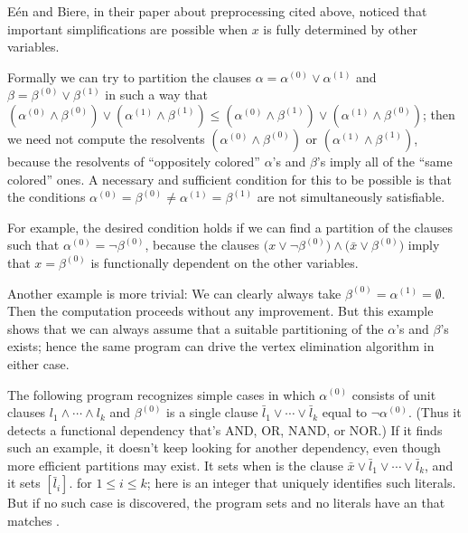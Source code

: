 E\'en and Biere, in their paper about preprocessing cited
above,
noticed that important simplifications are possible when $x$ is fully
determined by other variables.

Formally we can try to partition the
clauses $\alpha=\alpha^{(0)}\lor\alpha^{(1)}$ and
$\beta=\beta^{(0)}\lor\beta^{(1)}$ in such a way that
$(\alpha^{(0)}\land\beta^{(0)})\lor
(\alpha^{(1)}\land\beta^{(1)})\le
(\alpha^{(0)}\land\beta^{(1)})\lor
(\alpha^{(1)}\land\beta^{(0)})$;
then we need not compute the resolvents
$(\alpha^{(0)}\land\beta^{(0)})$ or
$(\alpha^{(1)}\land\beta^{(1)})$, because the resolvents of ``oppositely
colored'' $\alpha$'s and $\beta$'s imply all of the ``same colored'' ones.
A necessary and sufficient condition for this to be possible is that
the conditions $\alpha^{(0)}=\beta^{(0)}\ne\alpha^{(1)}=\beta^{(1)}$
are not simultaneously satisfiable.

For example, the desired condition holds if we can find
a partition of the clauses such that $\alpha^{(0)}=\lnot\beta^{(0)}$,
because the clauses $\bigl(x\lor\lnot\beta^{(0)}\bigr)
\land\bigl(\bar x\lor\beta^{(0)}\bigr)$ imply that $x=\beta^{(0)}$
is functionally dependent on the other variables.

Another example is more trivial: We can clearly always take $\beta^{(0)}=
\alpha^{(1)}=\emptyset$. Then the computation proceeds without any improvement.
But this example shows that we can always assume that a suitable partitioning
of the $\alpha$'s and $\beta$'s exists; hence the same program
can drive the vertex elimination algorithm in either case.

The following program recognizes simple cases in which
$\alpha^{(0)}$ consists of unit clauses $l_1\land\cdots\land l_k$
and $\beta^{(0)}$ is a single clause $\bar l_1\lor\cdots\lor\bar l_k$
equal to $\lnot\alpha^{(0)}$. (Thus it detects a functional
dependency that's {\mc AND}, {\mc OR}, {\mc NAND}, or {\mc NOR}.)
If it finds such an example,
it doesn't keep looking for another dependency, even though
more efficient partitions may exist. It sets  when
 is the clause $\bar x\lor\bar l_1\lor\cdots\lor\bar l_k$,
and it sets $[\bar l_i]$. for $1\le i%
\le k$;
here  is an integer that uniquely identifies such literals.
But if no such case is discovered, the program sets  and
no literals have an  that matches .

